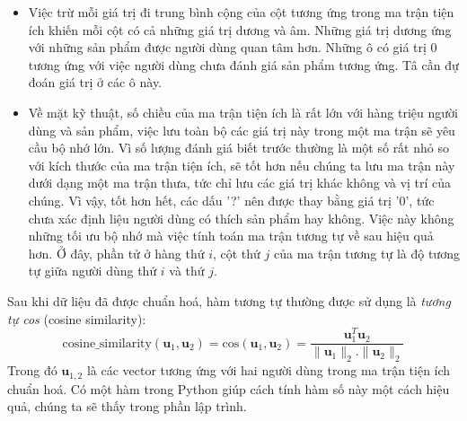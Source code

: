 \begin{itemize}
    \item Việc trừ mỗi giá trị đi trung bình cộng của {cột} tương ứng trong ma trận tiện ích khiến mỗi
    cột có cả những giá trị dương và âm. Những giá trị dương ứng với những sản phẩm được người dùng quan tâm hơn. Những ô có giá trị 0 tương ứng với việc người dùng chưa đánh giá sản phẩm tương ứng. Tâ cần đự đoán giá trị ở các ô này. 

    \item Về mặt kỹ thuật, số chiều của ma trận tiện ích là rất lớn với
    hàng triệu người dùng và sản phẩm, việc lưu toàn bộ các giá trị này
    trong một ma trận sẽ yêu cầu bộ nhớ lớn.
    Vì số lượng đánh giá biết trước thường là một số rất nhỏ so với kích thước
    của ma trận tiện ích, sẽ tốt hơn nếu chúng ta lưu ma trận này dưới dạng một
    ma trận thưa, tức chỉ lưu các giá trị khác không và vị trí của
    chúng. Vì vậy, tốt hơn hết, các dấu '?' nên được thay bằng giá trị '0', tức
    chưa xác định liệu người dùng có thích sản phẩm hay không. Việc này
    không những tối ưu bộ nhớ mà việc tính toán ma trận tương tự về sau hiệu quả hơn. Ở đây, phần tử ở hàng thứ $i$, cột thứ $j$ của ma
    trận tương tự là độ tương tự giữa người dùng thứ $i$
    và thứ $j$.
\end{itemize}
Sau khi dữ liệu đã được chuẩn hoá, hàm tương tự thường được sử
dụng là \textit{tương tự cos} ({cosine similarity}):
\begin{equation} 
\text{cosine\_similarity}(\mathbf{u}_1, \mathbf{u}_2) =\text{cos}(\mathbf{u}_1, \mathbf{u}_2)  
=  \frac{\mathbf{u}_1^T\mathbf{u}_2}{ \|\mathbf{u}_1\|_2.\|\mathbf{u}_2\|_2}
\end{equation} 
Trong đó $\mathbf{u}_{1, 2}$ là các vector tương ứng với hai người dùng trong ma
trận tiện ích chuẩn hoá. Có một hàm trong Python giúp cách tính hàm số này một
cách hiệu quả, chúng ta sẽ thấy trong phần lập trình.
 
